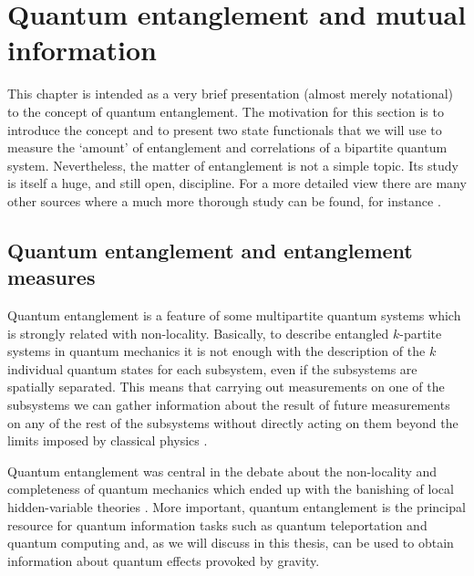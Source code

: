 
\chapter{Quantum entanglement and mutual information}\label{QIi}

This chapter is intended as a very brief presentation (almost merely notational) to the concept of quantum entanglement. The motivation for this section is to introduce the concept and to present two state functionals that we will use to measure the `amount' of entanglement and correlations of a bipartite quantum system. Nevertheless, the matter of entanglement is not a simple topic. Its study is itself  a huge, and still open, discipline. For a more detailed view there are many other sources where a much more thorough study can be found, for instance \cite{Nichuang}. 

\section{Quantum entanglement and entanglement measures}\label{entangsec}

Quantum entanglement is a feature of some multipartite quantum systems which is strongly related with non-locality. Basically, to describe entangled $k$-partite systems in quantum mechanics it is not enough with the description of the $k$ individual quantum states for each subsystem, even if the subsystems are spatially separated. This means that carrying out measurements on one of the subsystems we can gather information about the result of future measurements on any of the rest of the subsystems without directly acting on them beyond the limits imposed by classical physics \cite{Bellprime}.

 Quantum entanglement was central in the debate about the non-locality and completeness of quantum mechanics \cite{EPR0} which ended up with the banishing of local hidden-variable theories \cite{EPRtest}. More important, quantum entanglement is the principal resource for quantum information tasks such as quantum teleportation \cite{telep1} and quantum computing \cite{Nichuang} and, as we will discuss in this thesis, can be used to obtain information about quantum effects provoked by gravity.

